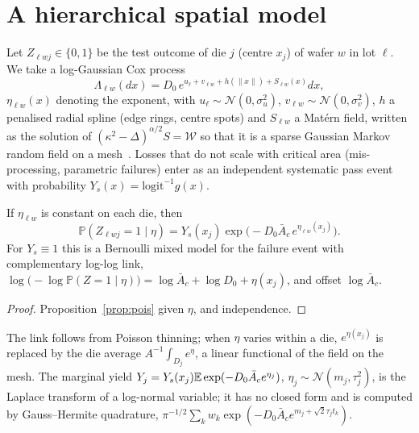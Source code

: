 \documentclass[10pt,twocolumn]{article}
\newcommand{\Ac}{\bar A_c}
\newcommand{\Prob}{\mathbb{P}}
\begin{document}
\section{A hierarchical spatial model}
Let $Z_{\ell wj}\in\{0,1\}$ be the test outcome of die $j$ (centre $x_j$) of wafer $w$ in lot $\ell$. We take a log-Gaussian Cox process~\cite{moller1998}
\begin{equation}
\Lambda_{\ell w}(dx)=D_0\,e^{u_\ell+v_{\ell w}+h(\|x\|)+S_{\ell w}(x)}dx,
\end{equation}
$\eta_{\ell w}(x)$ denoting the exponent, with $u_\ell\sim\mathcal N(0,\sigma_u^2)$, $v_{\ell w}\sim\mathcal N(0,\sigma_v^2)$, $h$ a penalised radial spline (edge rings, centre spots) and $S_{\ell w}$ a Mat\'ern field, written as the solution of $(\kappa^2-\Delta)^{\alpha/2}S=\mathcal W$ so that it is a sparse Gaussian Markov random field on a mesh~\cite{lindgren2011}. Losses that do not scale with critical area (mis-processing, parametric failures) enter as an independent systematic pass event with probability $Y_s(x)=\mathrm{logit}^{-1}g(x)$.

\begin{proposition}\label{prop:link}
If $\eta_{\ell w}$ is constant on each die, then
\begin{equation}
\Prob(Z_{\ell wj}=1\mid\eta)=Y_s(x_j)\exp\!\big(-D_0\Ac\,e^{\eta_{\ell w}(x_j)}\big).
\end{equation}
For $Y_s\equiv1$ this is a Bernoulli mixed model for the failure event with complementary log-log link, $\log\!\big(-\log\Prob(Z=1\mid\eta)\big)=\log\Ac+\log D_0+\eta(x_j)$, and offset $\log\Ac$.
\end{proposition}
\begin{proof}
Proposition~\ref{prop:pois} given $\eta$, and independence.
\end{proof}
The link follows from Poisson thinning; when $\eta$ varies within a die, $e^{\eta(x_j)}$ is replaced by the die average $A^{-1}\int_{D_j}e^{\eta}$, a linear functional of the field on the mesh. The marginal yield $Y_j=Y_s(x_j)\E\exp(-D_0\Ac e^{\eta_j})$, $\eta_j\sim\mathcal N(m_j,\tau_j^2)$, is the Laplace transform of a log-normal variable; it has no closed form and is computed by Gauss--Hermite quadrature, $\pi^{-1/2}\sum_kw_k\exp(-D_0\Ac e^{m_j+\sqrt2\tau_jt_k})$.
\end{document}
